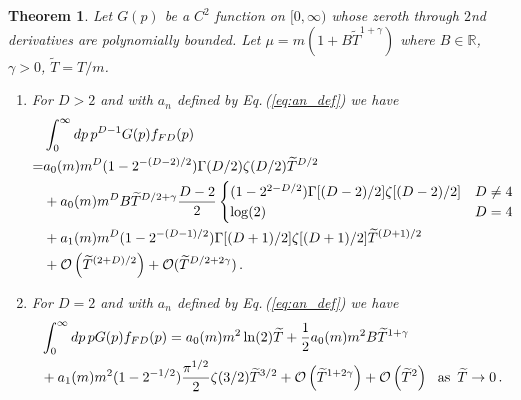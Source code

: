 \documentclass[sn-mathphys,Numbered]{sn-jnl}
\newcommand{\req}[1]{Eq.\,(\ref{#1})}
\newcommand*{\xred}{\color{black}}
\newtheorem{theorem}{Theorem}
\begin{document}
\begin{theorem}\label{thm:mu_zero_faster}
Let $G(p)$ be a $C^2$ function on $[0,\infty)$ whose zeroth through $2$nd derivatives are polynomially bounded. Let $\mu=m(1+B\widetilde{T}^{1+\gamma})$ where $B\in\mathbb{R}$, $\gamma>0$, $\widetilde{T}=T/m$. 
\begin{enumerate}
 \item {\xred For $D>2$ and with $a_n$ defined by \req{eq:an_def} we have
\begin{align}
&\int_0^\infty dp\, p^{D-1} G(p) f_{FD}(p)\label{eq:FD_b_decay_orig_integral}\\
 =&a_0(m)m^{D}(1 - 2^{-(D-2)/2}) \Gamma( D/2) \zeta(D/2)\widetilde{T}^{D/2}\notag\\
 &+ a_0(m)m^{D}B\widetilde{T}^{D/2+\gamma}\frac{D-2}{2}\begin{cases}
 (1-2^{2-D/2})\Gamma[(D-2)/2]\zeta[(D-2)/2]& D\neq 4\\
 \log(2) &D=4
 \end{cases}\notag\\
 &+a_1(m)m^{D}(1 - 2^{-(D-1)/2}) \Gamma[(D+1)/2] \zeta[(D+1)/2]\widetilde{T}^{(D+1)/2}\notag\\
 &+\mathcal{O}\left(\widetilde{T}^{(2+D)/2}\right)+\mathcal{O}(\widetilde{T}^{D/2+2\gamma})\,.\label{eq:asymp_FD_int_b_decay}
\end{align}
}
\item For $D=2$ and with $a_n$ defined by \req{eq:an_def} we have
\begin{align}
&\int_0^\infty dp\, p G(p) f_{FD}(p) 
 =  a_0(m)m^{2}\ln(2)\widetilde{T}+\frac{1}{2}a_0(m)m^{2}B\widetilde{T}^{1+\gamma}\notag\\&+a_1(m)m^{2}(1 - 2^{-1/2}) \frac{\pi^{1/2}}{2} \zeta(3/2)\widetilde{T}^{3/2} +\mathcal{O}\left(\widetilde{T}^{1+2\gamma}\right)+\mathcal{O}\left(\widetilde{T}^{2}\right) \,\,\,\,\text{as}\,\, \,\widetilde{T}\to 0\,.\label{eq:asymp_FD_int_b_decay_D2}
\end{align}
\end{enumerate}

\end{theorem}
\end{document}
